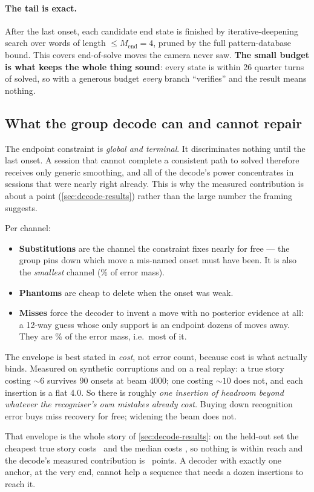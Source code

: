 \paragraph{The tail is exact.} After the last onset, each candidate end state
is finished by iterative-deepening search over words of length
$\le M_{\mathrm{end}} = 4$, pruned by the full pattern-database bound. This
covers end-of-solve moves the camera never saw. \textbf{The small budget is
what keeps the whole thing sound}: every state is within 26 quarter turns of
solved, so with a generous budget \emph{every} branch ``verifies'' and the
result means nothing.

\subsection{What the group decode can and cannot repair}
\label{sec:decode-limits}

The endpoint constraint is \emph{global and terminal}. It discriminates
nothing until the last onset. A session that cannot complete a consistent
path to solved therefore receives only generic smoothing, and all of the
decode's power concentrates in sessions that were nearly right already. This
is why the measured contribution is about a point (\cref{sec:decode-results})
rather than the large number the framing suggests.

Per channel:
\begin{itemize}[leftmargin=1.3em,itemsep=2pt]
\item \textbf{Substitutions} are the channel the constraint fixes nearly for
free --- the group pins down which move a mis-named onset must have been. It
is also the \emph{smallest} channel (\SubShare\% of error mass).
\item \textbf{Phantoms} are cheap to delete when the onset was weak.
\item \textbf{Misses} force the decoder to invent a move with no posterior
evidence at all: a 12-way guess whose only support is an endpoint dozens of
moves away. They are \MissShare\% of the error mass, i.e.\ most of it.
\end{itemize}

The envelope is best stated in \emph{cost}, not error count, because cost is
what actually binds. Measured on synthetic corruptions and on a real replay:
a true story costing ${\sim}6$ survives 90 onsets at beam 4000; one costing
${\sim}10$ does not, and each insertion is a flat 4.0. So there is roughly
\emph{one insertion of headroom beyond whatever the recogniser's own mistakes
already cost.} Buying down recognition error buys miss recovery for free;
widening the beam does not.

That envelope is the whole story of \cref{sec:decode-results}: on the
held-out set the cheapest true story costs \MinGtPathCost\ and the median
costs \MedGtPathCost, so nothing is within reach and the decode's measured
contribution is \DecodeGain\ points. A decoder with exactly one anchor, at
the very end, cannot help a sequence that needs a dozen insertions to reach
it.
